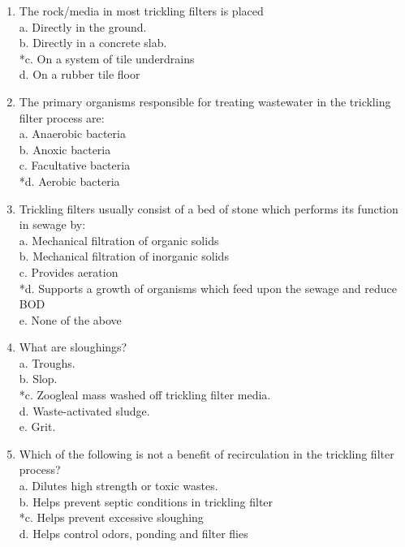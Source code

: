 \begin{enumerate}
\item  The rock/media in most trickling filters is placed \\

 a. Directly in the ground. \\
 b. Directly in a concrete slab. \\
 *c. On a system of tile underdrains \\
 d. On a rubber tile floor \\


\item  The primary organisms responsible for treating wastewater in the trickling filter process are: \\

 a. Anaerobic bacteria \\
 b. Anoxic bacteria \\
 c. Facultative bacteria \\
 *d. Aerobic bacteria \\


\item  Trickling filters usually consist of a bed of stone which performs its function in sewage by: \\

 a. Mechanical filtration of organic solids \\
 b. Mechanical filtration of inorganic solids \\
 c. Provides aeration \\
 *d. Supports a growth of organisms which feed upon the sewage and reduce BOD \\
 e. None of the above \\


\item  What are sloughings? \\

 a. Troughs. \\
 b. Slop. \\
 *c. Zoogleal mass washed off trickling filter media. \\
 d. Waste-activated sludge. \\
 e. Grit. \\


\item  Which of the following is not a benefit of recirculation in the trickling filter process? \\

 a. Dilutes high strength or toxic wastes. \\
 b. Helps prevent septic conditions in trickling filter \\
 *c. Helps prevent excessive sloughing \\
 d. Helps control odors, ponding and filter flies \\


\end{enumerate}